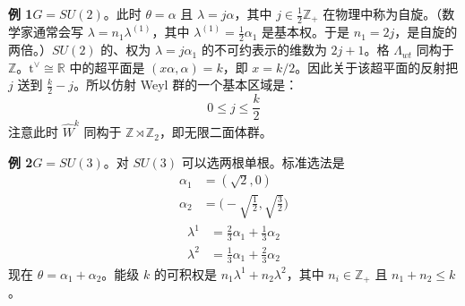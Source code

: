 \textbf{例 1}\quad $G=SU(2)$。此时 $\theta=\alpha$ 且 $\lambda=j\alpha$，其中 $j\in\frac12\mathbb{Z}_+$ 在物理中称为自旋。（数学家通常会写 $\lambda=n_1\lambda^{(1)}$，其中 $\lambda^{(1)}=\frac12\alpha_1$ 是基本权。于是 $n_1=2j$，是自旋的两倍。）$SU(2)$ 的、权为 $\lambda=j\alpha_1$ 的不可约表示的维数为 $2j+1$。格 $\Lambda_{wt}$ 同构于 $\mathbb{Z}$。$\mathrm{t}^\vee\cong\mathbb{R}$ 中的超平面是 $(x\alpha,\alpha)=k$，即 $x=k/2$。因此关于该超平面的反射把 $j$ 送到 $\frac{k}{2}-j$。所以仿射 Weyl 群的一个基本区域是：
\begin{equation}
  0\le j\le\frac{k}{2}
  \tag{4.153}
  \label{eq:4.153}
\end{equation}
注意此时 $\widehat{W}^k$ 同构于 $\mathbb{Z}\rtimes\mathbb{Z}_2$，即无限二面体群。

\textbf{例 2}\quad $G=SU(3)$。对 $SU(3)$ 可以选两根单根。标准选法是
\begin{equation}
\begin{aligned}
  \alpha_1 &= (\sqrt{2},0)\\
  \alpha_2 &= \Big(-\sqrt{\frac12},\sqrt{\frac32}\Big)
\end{aligned}
  \tag{4.154}
  \label{eq:4.154}
\end{equation}
\begin{equation}
\begin{aligned}
  \lambda^1 &= \frac23\alpha_1+\frac13\alpha_2\\
  \lambda^2 &= \frac13\alpha_1+\frac23\alpha_2
\end{aligned}
  \tag{4.155}
  \label{eq:4.155}
\end{equation}
现在 $\theta=\alpha_1+\alpha_2$。能级 $k$ 的可积权是 $n_1\lambda^1+n_2\lambda^2$，其中 $n_i\in\mathbb{Z}_+$ 且 $n_1+n_2\le k$。

